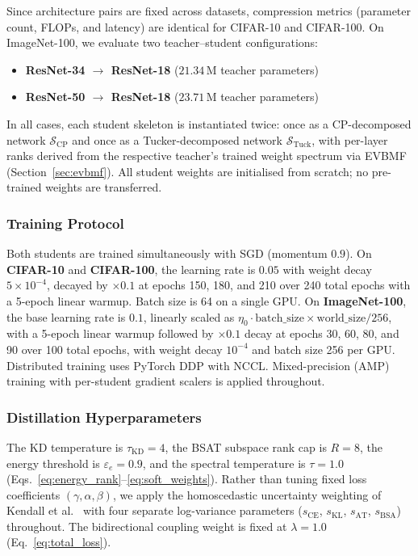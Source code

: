 \documentclass[conference]{IEEEtran}
\begin{document}
Since architecture pairs are fixed across datasets, compression metrics
(parameter count, FLOPs, and latency) are identical for CIFAR-10 and
CIFAR-100.
On ImageNet-100, we evaluate two teacher--student configurations:

\begin{itemize}
  \item \textbf{ResNet-34 $\to$ ResNet-18} ($21.34$\,M teacher parameters)
  \item \textbf{ResNet-50 $\to$ ResNet-18} ($23.71$\,M teacher parameters)
\end{itemize}

In all cases, each student skeleton is instantiated twice: once as a
CP-decomposed network $\mathcal{S}_{\mathrm{CP}}$ and once as a
Tucker-decomposed network $\mathcal{S}_{\mathrm{Tuck}}$, with per-layer ranks
derived from the respective teacher's trained weight spectrum via EVBMF
(Section~\ref{sec:evbmf}). All student weights are initialised from scratch;
no pre-trained weights are transferred.

\subsubsection{Training Protocol}
Both students are trained simultaneously with SGD (momentum $0.9$).
On \textbf{CIFAR-10} and \textbf{CIFAR-100}, the learning rate is $0.05$
with weight decay $5\!\times\!10^{-4}$, decayed by $\times\!0.1$ at epochs
150, 180, and 210 over 240 total epochs with a 5-epoch linear warmup.
Batch size is 64 on a single GPU.
On \textbf{ImageNet-100}, the base learning rate is $0.1$, linearly scaled
as $\eta_0\!\cdot\!\text{batch\_size}\!\times\!\text{world\_size}/256$, with
a 5-epoch linear warmup followed by $\times\!0.1$ decay at epochs 30, 60,
80, and 90 over 100 total epochs, with weight decay $10^{-4}$ and batch
size 256 per GPU.
Distributed training uses PyTorch DDP with NCCL.
Mixed-precision (AMP) training with per-student gradient scalers is applied
throughout.

\subsubsection{Distillation Hyperparameters}
The KD temperature is $\tau_\mathrm{KD} = 4$, the BSAT subspace rank cap is
$R = 8$, the energy threshold is $\varepsilon_e = 0.9$, and the spectral
temperature is $\tau = 1.0$ (Eqs.~\ref{eq:energy_rank}--\ref{eq:soft_weights}).
Rather than tuning fixed loss coefficients $(\gamma, \alpha, \beta)$, we
apply the homoscedastic uncertainty weighting of Kendall
et al.~\cite{kendall2018multi} with four separate log-variance parameters
($s_\mathrm{CE}$, $s_\mathrm{KL}$, $s_\mathrm{AT}$, $s_\mathrm{BSA}$) throughout.
The bidirectional coupling weight is fixed at $\lambda = 1.0$
(Eq.~\ref{eq:total_loss}).
\end{document}
